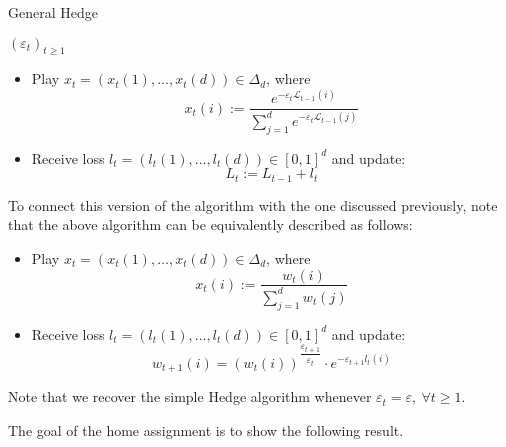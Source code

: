 \documentclass[12pt]{report}
\begin{document}
\begin{algorithm*}
\caption[short]{General Hedge}
\begin{algorithmic}
    \Require $\left(\varepsilon_t\right)_{t \geq 1}$ 
     \hspace*{-6cm}
    \begin{itemize}
        \item Play $x_t = \left(x_t(1), \ldots, x_t(d)\right) \in \Delta_d$, where 
        \[
            x_t(i) := \dfrac{e^{\displaystyle - \varepsilon_t\mathcal{L}_{t-1}(i)}}{\sum\limits_{j=1}^d e^{\displaystyle -\varepsilon_t\mathcal{L}_{t-1}(j)}}  
        \]
        \item Receive loss $l_t = \left(l_t(1), \ldots, l_t(d)\right) \in [0,1]^d$ and update:
        \[
            L_t := L_{t-1} + l_t  
        \]
    \end{itemize}
    \EndFor
\end{algorithmic}
\end{algorithm*}
\begin{note}{}{}
    To connect this version of the algorithm with the one discussed previously, note that the above algorithm can be equivalently described as follows:
    \begin{algorithmic}
        \begin{itemize}
            \item Play $x_t = \left(x_t(1), \ldots, x_t(d)\right) \in \Delta_d$, where 
            \[
                x_t(i) := \dfrac{w_t(i)}{\sum\limits_{j=1}^d w_t(j)}
            \]
            \item Receive loss $l_t = \left(l_t(1), \ldots, l_t(d)\right) \in [0,1]^d$ and update:
            \[
                w_{t+1}(i) = \left(w_t(i)\right)^{\dfrac{\varepsilon_{t+1}}{\varepsilon_t}} \cdot e^{\displaystyle - \varepsilon_{t+1}l_t(i)}  
            \]
        \end{itemize}
        \EndFor
    \end{algorithmic}
\end{note}
\par
Note that we recover the simple Hedge algorithm whenever $\varepsilon_t = \varepsilon, \ \forall t \geq 1.$
\par 
The goal of the home assignment is to show the following result.
\end{document}
